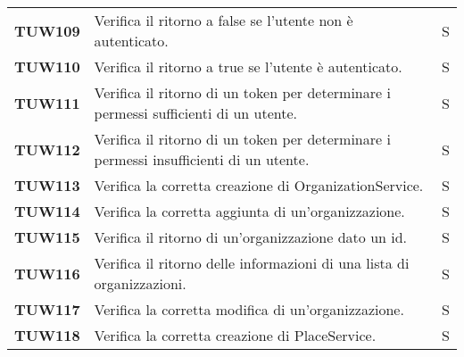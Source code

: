 \documentclass[../../piano-di-qualifica.tex]{subfiles}
\begin{document}
\begin{longtable}[H]{>{\centering\bfseries}m{3cm} >{}m{10cm} >{\centering\arraybackslash}m{3cm}}
  TUW109             & Verifica il ritorno a false se l'utente non è autenticato.                                                          & S                             \\

  TUW110             & Verifica il ritorno a true se l'utente è autenticato.                                                               & S                             \\

  TUW111             & Verifica il ritorno di un token per determinare i permessi sufficienti di un utente.                                & S                             \\

  TUW112             & Verifica il ritorno di un token per determinare i permessi insufficienti di un utente.                              & S                             \\



  TUW113             & Verifica la corretta creazione di OrganizationService.                                                              & S                             \\

  TUW114             & Verifica la corretta aggiunta di un'organizzazione.                                                                 & S                             \\

  TUW115             & Verifica il ritorno di un'organizzazione dato un id.                                                                & S                             \\

  TUW116             & Verifica il ritorno delle informazioni di una lista di organizzazioni.                                              & S                             \\

  TUW117             & Verifica la corretta modifica di un'organizzazione.                                                                 & S                             \\

  TUW118             & Verifica la corretta creazione di PlaceService.                                                                     & S                             \\


\end{longtable}
\end{document}
